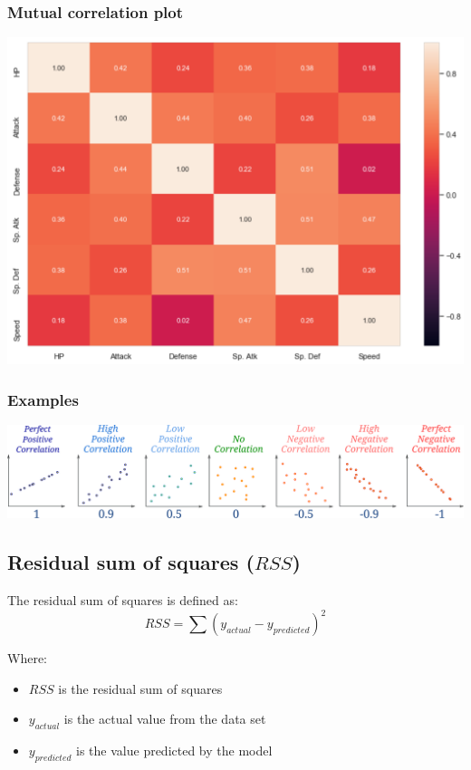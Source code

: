 \documentclass[11pt]{article}
\begin{document}
\subsubsection{Mutual correlation plot}
\label{sec:org8b6a829}
\begin{center}
\includegraphics[width=.9\linewidth]{./images/mutual-correlation-plot.png}
\end{center}
\subsubsection{Examples}
\label{sec:orga508e02}
\begin{center}
\includegraphics[width=.9\linewidth]{./images/correlation-examples.png}
\end{center}
\subsection{Residual sum of squares (\(RSS\))}
\label{sec:orgb3a0edb}
The residual sum of squares is defined as:
\[RSS = \sum (y_{actual} - y_{predicted})^2\]

Where:
\begin{itemize}
\item \(RSS\) is the residual sum of squares
\item \(y_{actual}\) is the actual value from the data set
\item \(y_{predicted}\) is the value predicted by the model
\end{itemize}
\end{document}
